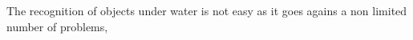 The recognition of objects under water is not easy as it goes agains a non limited number
of problems, 